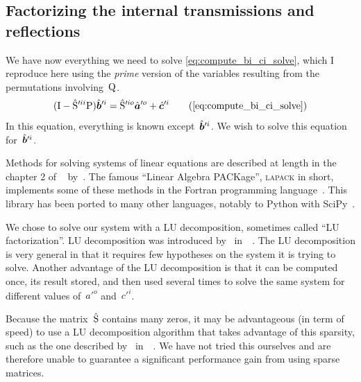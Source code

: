 
\subsection{Factorizing the internal transmissions and reflections}

We have now everything we need to solve \cref{eq:compute_bi_ci_solve}, which I reproduce here using the \textit{prime} version of the variables resulting from the permutations involving~$\mathrm{Q}$.
\begin{equation}
    (\matr{I} - \matrcp{S}'^{ii}\matr{P})\vectcp{b}'^i =
    \matrcp{S}'^{io} \vectcp{a}'^o + \vectcp{c}'^i
    \tag{\ref{eq:compute_bi_ci_solve}}
\end{equation}
In this equation, everything is known except~$\hat{\bm{b}}'^i$.
We wish to solve this equation for~$\hat{\bm{b}}'^i$.

Methods for solving systems of linear equations are described at length in the chapter 2 of ~\cite{Press:2007:NRE:1403886} by~\citeauthor{Press:2007:NRE:1403886}.
The famous ``Linear Algebra PACKage'', \textsc{lapack} in short, implements some of these methods in the Fortran programming language~\cite{lapack}.
This library has been ported to many other languages, notably to Python with SciPy~\cite{scipy}.

We chose to solve our system with a LU decomposition, sometimes called ``LU factorization''.
LU decomposition was introduced by~\citeauthor{turing1948rounding} in~~\cite{turing1948rounding}.
The LU decomposition is very general in that it requires few hypotheses on the system it is trying to solve.
Another advantage of the LU decomposition is that it can be computed once, its result stored, and then used several times to solve the same system for different values of~$a'^o$ and~$c'^i$.

Because the matrix~$\hat{\mathrm{S}}$ contains many zeros, it may be advantageous (in term of speed) to use a LU decomposition algorithm that takes advantage of this sparsity, such as the one described by~\citeauthor{dongarra2001recursive} in~~\cite{dongarra2001recursive}.
We have not tried this ourselves and are therefore unable to guarantee a significant performance gain from using sparse matrices.

